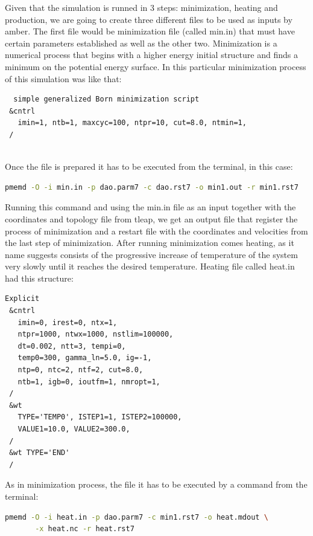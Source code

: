 \documentclass[a4paper]{article}
\begin{document}
Given that the simulation is runned in 3 steps: minimization, heating and production, we are going to create three different files to be used as inputs by amber.
The first file would be minimization file (called min.in) that must have certain parameters established as well as the other two. Minimization is a numerical process that begins with a higher energy initial structure and finds a minimum on the potential energy surface. In this particular minimization process of this simulation was like that:

\begin{verbatim}
  simple generalized Born minimization script
 &cntrl
   imin=1, ntb=1, maxcyc=100, ntpr=10, cut=8.0, ntmin=1,
 /
 
\end{verbatim}

Once the file is prepared it has to be executed from the terminal, in this case:

\begin{lstlisting}[language=Bash,caption={Trehalose prepgen}]
pmemd -O -i min.in -p dao.parm7 -c dao.rst7 -o min1.out -r min1.rst7
\end{lstlisting}

Running this command and using the min.in file as an input together with the coordinates and topology file from tleap, we get an output file that register the process of minimization and a restart file with the coordinates and velocities from the last step of minimization. After running minimization comes heating, as it name suggests consists of the progressive increase of temperature of the system very slowly until it reaches the desired temperature.
Heating file called heat.in had this structure:


\begin{verbatim}
Explicit
 &cntrl
   imin=0, irest=0, ntx=1,
   ntpr=1000, ntwx=1000, nstlim=100000,
   dt=0.002, ntt=3, tempi=0,
   temp0=300, gamma_ln=5.0, ig=-1,
   ntp=0, ntc=2, ntf=2, cut=8.0,
   ntb=1, igb=0, ioutfm=1, nmropt=1,
 /
 &wt
   TYPE='TEMP0', ISTEP1=1, ISTEP2=100000,
   VALUE1=10.0, VALUE2=300.0,
 /
 &wt TYPE='END' 
 /

\end{verbatim}

As in minimization process, the file it has to be executed by a command from the terminal:

\begin{lstlisting}[language=Bash,caption={Heating run}]
pmemd -O -i heat.in -p dao.parm7 -c min1.rst7 -o heat.mdout \
       -x heat.nc -r heat.rst7
\end{lstlisting}
\end{document}
